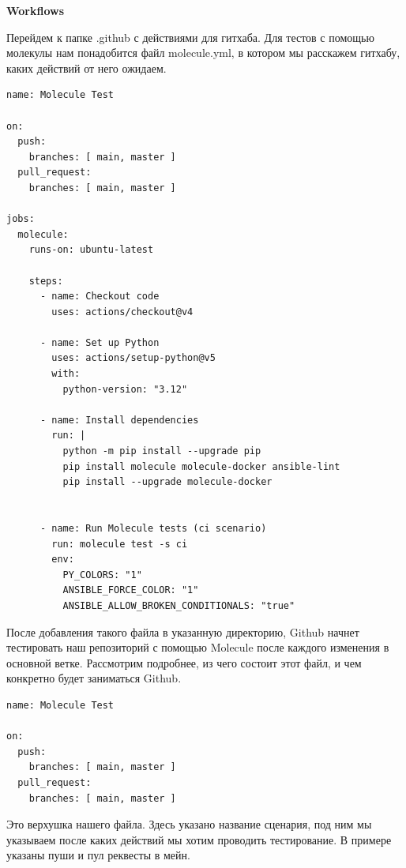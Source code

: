 \documentclass[12pt]{article}
\begin{document}
\newpage
{\Large\bfseries Workflows}\par
Перейдем к папке .github с действиями для гитхаба. Для тестов с помощью молекулы нам понадобится файл molecule.yml, в котором мы расскажем гитхабу, каких действий от него ожидаем.\\
\begin{lstlisting}
name: Molecule Test

on:
  push:
    branches: [ main, master ]
  pull_request:
    branches: [ main, master ]

jobs:
  molecule:
    runs-on: ubuntu-latest

    steps:
      - name: Checkout code
        uses: actions/checkout@v4

      - name: Set up Python
        uses: actions/setup-python@v5
        with:
          python-version: "3.12"
        
      - name: Install dependencies
        run: |
          python -m pip install --upgrade pip
          pip install molecule molecule-docker ansible-lint
          pip install --upgrade molecule-docker
          

      - name: Run Molecule tests (ci scenario)
        run: molecule test -s ci
        env:
          PY_COLORS: "1"
          ANSIBLE_FORCE_COLOR: "1"
          ANSIBLE_ALLOW_BROKEN_CONDITIONALS: "true"
\end{lstlisting}
После добавления такого файла в указанную директорию, Github начнет тестировать наш репозиторий с помощью Molecule после каждого изменения в основной ветке. Рассмотрим подробнее, из чего состоит этот файл, и чем конкретно будет заниматься Github.\\
\newpage
\begin{lstlisting}
name: Molecule Test

on:
  push:
    branches: [ main, master ]
  pull_request:
    branches: [ main, master ]
\end{lstlisting}\par
Это верхушка нашего файла. Здесь указано название сценария, под ним мы указываем после каких действий мы хотим проводить тестирование. В примере указаны пуши и пул реквесты в мейн.\par\vspace{10pt}
\end{document}
